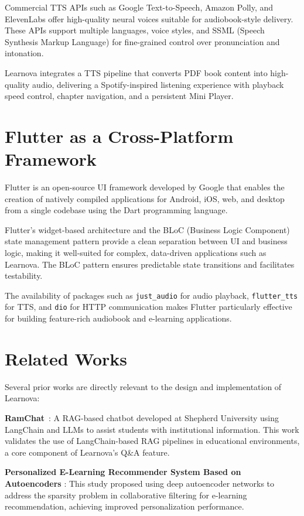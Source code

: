Commercial TTS APIs such as Google Text-to-Speech, Amazon Polly, and
ElevenLabs offer high-quality neural voices suitable for audiobook-style
delivery. These APIs support multiple languages, voice styles, and SSML
(Speech Synthesis Markup Language) for fine-grained control over
pronunciation and intonation.

Learnova integrates a TTS pipeline that converts PDF book content into
high-quality audio, delivering a Spotify-inspired listening experience with
playback speed control, chapter navigation, and a persistent Mini Player.

\section{Flutter as a Cross-Platform Framework}
\label{sec:flutter}

Flutter is an open-source UI framework developed by Google that enables
the creation of natively compiled applications for Android, iOS, web, and
desktop from a single codebase using the Dart programming language.

Flutter's widget-based architecture and the BLoC (Business Logic Component)
state management pattern provide a clean separation between UI and business
logic, making it well-suited for complex, data-driven applications such as
Learnova. The BLoC pattern ensures predictable state transitions and
facilitates testability.

The availability of packages such as \texttt{just\_audio} for audio playback,
\texttt{flutter\_tts} for TTS, and \texttt{dio} for HTTP communication makes
Flutter particularly effective for building feature-rich audiobook and
e-learning applications.

\section{Related Works}
\label{sec:related}

Several prior works are directly relevant to the design and implementation
of Learnova:

\textbf{RamChat}~\cite{burgan2024}: A RAG-based chatbot developed at
Shepherd University using LangChain and LLMs to assist students with
institutional information. This work validates the use of LangChain-based
RAG pipelines in educational environments, a core component of Learnova's
Q\&A feature.

\textbf{Personalized E-Learning Recommender System Based on Autoencoders}
\cite{autoencoder2023}: This study proposed using deep autoencoder networks
to address the sparsity problem in collaborative filtering for e-learning
recommendation, achieving improved personalization performance.

